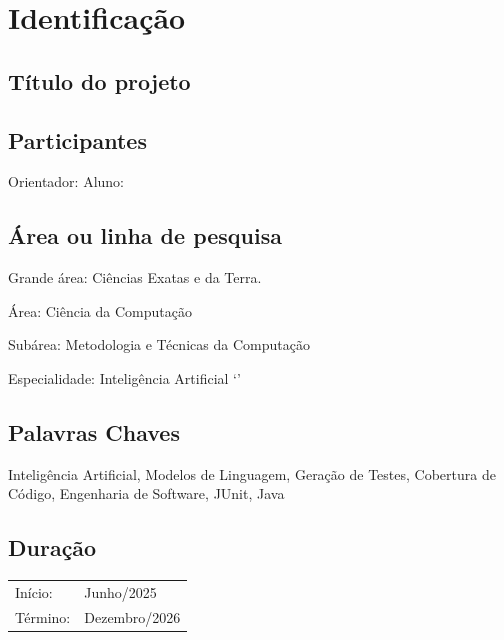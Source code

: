 \section{Identificação}

\subsection{Título do projeto}
    \titulo

\subsection{Participantes}
Orientador: \orientador
Aluno: \nome

\subsection{Área ou linha de pesquisa}
Grande área: Ciências Exatas e da Terra.

Área: Ciência da Computação

Subárea: Metodologia e Técnicas da Computação

Especialidade: Inteligência Artificial
`'
\subsection{Palavras Chaves}
Inteligência Artificial, Modelos de Linguagem, Geração de Testes, Cobertura de Código, Engenharia de Software, JUnit, Java

\subsection{Duração}
\begin{table}[H]
    \begin{tabular}{ll}
        Início: & Junho/2025\\
        Término: & Dezembro/2026\\
    \end{tabular}
\end{table}